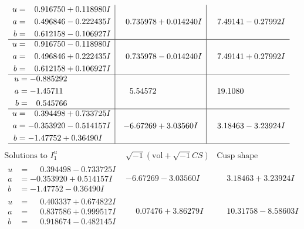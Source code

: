 \documentclass[1p]{elsarticle_modified}
\theoremstyle{definition}
\newcommand{\I}{\sqrt{-1}}
\begin{document}
$$\begin{array}{c|c|c}
\begin{aligned}
u &= \phantom{-}0.916750 + 0.118980 I \\
a &= \phantom{-}0.496846 - 0.222435 I \\
b &= \phantom{-}0.612158 - 0.106927 I\end{aligned}
 & \phantom{-}0.735978 + 0.014240 I & \phantom{-}7.49141 - 0.27992 I \\ \hline\begin{aligned}
u &= \phantom{-}0.916750 - 0.118980 I \\
a &= \phantom{-}0.496846 + 0.222435 I \\
b &= \phantom{-}0.612158 + 0.106927 I\end{aligned}
 & \phantom{-}0.735978 - 0.014240 I & \phantom{-}7.49141 + 0.27992 I \\ \hline\begin{aligned}
u &= -0.885292\phantom{ +0.000000I} \\
a &= -1.45711\phantom{ +0.000000I} \\
b &= \phantom{-}0.545766\phantom{ +0.000000I}\end{aligned}
 & \phantom{-}5.54572\phantom{ +0.000000I} & \phantom{-}19.1080\phantom{ +0.000000I} \\ \hline\begin{aligned}
u &= \phantom{-}0.394498 + 0.733725 I \\
a &= -0.353920 - 0.514157 I \\
b &= -1.47752 + 0.36490 I\end{aligned}
 & -6.67269 + 3.03560 I & \phantom{-}3.18463 - 3.23924 I\\
 \hline 
 \end{array}$$\newpage$$\begin{array}{c|c|c}  
\text{Solutions to }I^u_{1}& \I (\text{vol} + \sqrt{-1}CS) & \text{Cusp shape}\\
 \hline 
\begin{aligned}
u &= \phantom{-}0.394498 - 0.733725 I \\
a &= -0.353920 + 0.514157 I \\
b &= -1.47752 - 0.36490 I\end{aligned}
 & -6.67269 - 3.03560 I & \phantom{-}3.18463 + 3.23924 I \\ \hline\begin{aligned}
u &= \phantom{-}0.403337 + 0.674822 I \\
a &= \phantom{-}0.837586 + 0.999517 I \\
b &= \phantom{-}0.918674 - 0.482145 I\end{aligned}
 & \phantom{-}0.07476 + 3.86279 I & \phantom{-}10.31758 - 8.58603 I \\ \hline\begin{aligned}

\end{aligned}
\end{array}$$
\end{document}
